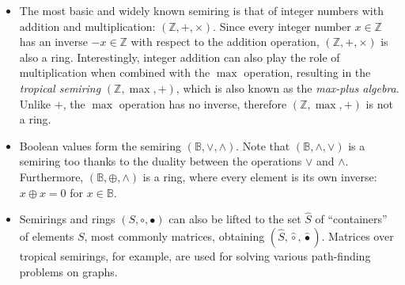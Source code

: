 \begin{itemize}
  \item The most basic and widely known semiring is that of integer numbers with
  addition and multiplication: $(\mathbb{Z}, +, \times)$. Since every integer
  number $x\in \mathbb{Z}$ has an inverse $-x \in \mathbb{Z}$ with respect to
  the addition operation, $(\mathbb{Z}, +, \times)$ is also a ring.
  Interestingly, integer addition can also play the role of multiplication when
  combined with the $\max$ operation, resulting in the \emph{tropical semiring}
  $(\mathbb{Z}, \max, +)$, which is also known as the \emph{max-plus algebra}.
  Unlike $+$, the $\max$ operation has no inverse, therefore
  $(\mathbb{Z}, \max, +)$ is not a ring.

  \item Boolean values form the semiring $(\mathbb{B}, \vee, \wedge)$. Note that
  $(\mathbb{B}, \wedge, \vee)$ is a semiring too thanks to the duality between
  the operations $\vee$ and $\wedge$. Furthermore,
  $(\mathbb{B}, \oplus, \wedge)$ is a ring, where every element is its own
  inverse: $x \oplus x = 0$ for $x \in \mathbb{B}$.

  \item Semirings and rings $(S, \circ, \bullet)$ can also be lifted to the set
  $\hat{S}$ of ``containers'' of elements $S$, most commonly matrices, obtaining
  $(\hat{S}, \hat{\circ}, \hat{\bullet})$. Matrices over tropical semirings, for
  example, are used for solving various path-finding problems on graphs.

\end{itemize}

